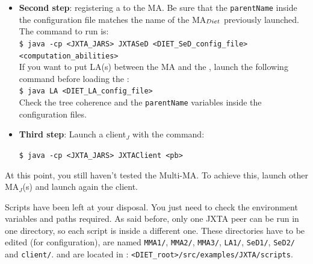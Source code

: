 \begin{itemize}
\item{\textbf{Second step}: registering a \sed to the MA. Be sure that
    the \texttt{parentName} inside the configuration file matches the
    name of the MA$_{{\sc Diet}}$ previously launched. The command to run is:\\
    {\footnotesize \texttt{\$ java -cp <JXTA\_JARS> JXTASeD
        <DIET\_SeD\_config\_file> <computation\_abilities>}
    }\\
    If you want to put LA(s) between the MA and the
    \sed, launch the following command before loading the \sed:\\
    {\footnotesize
      \texttt{\$ java LA <DIET\_LA\_config\_file>}
    }\\ Check the \diet tree coherence and the \texttt{parentName}
    variables inside the configuration files. }
\item{\textbf{Third step}: Launch a client$_{J}$ with the command:\\
    {\footnotesize
      \texttt{\$ java -cp <JXTA\_JARS> JXTAClient <pb>}

   }
 }

  \end{itemize}
  

At this point, you still haven't tested the Multi-MA. To achieve this,
launch other MA$_{J}$(s) and launch again the client.

Scripts have been left at your disposal. You just need to check the
environment variables and paths required. As said before, only one
JXTA peer can be run in one directory, so each script is inside a
different one. These directories have to be edited (for
configuration), are named \texttt{MMA1/}, \texttt{MMA2/},
\texttt{MMA3/}, \texttt{LA1/}, \texttt{SeD1/}, \texttt{SeD2/} and
\texttt{client/}.  and are located in :
\texttt{<DIET\_root>/src/examples/JXTA/scripts}.



